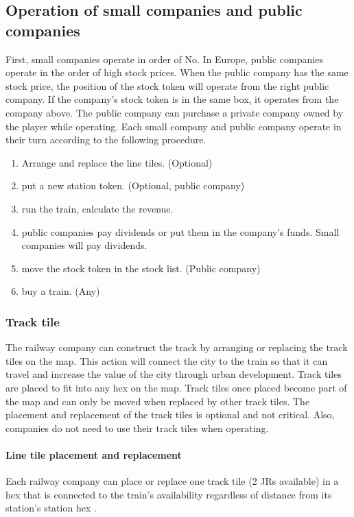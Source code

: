 \documentclass{article}
\begin{document}
\begin{CJK}{UTF8}{min}
\subsection{Operation of small companies and public companies}
First, small companies operate in order of No. In Europe, public
companies operate in the order of high stock prices. When the public
company has the same stock price, the position of the stock token will
operate from the right public company. If the company's stock token is
in the same box, it operates from the company above. The public
company can purchase a private company owned by the player while
operating. Each small company and public company operate in their turn
according to the following procedure.
\begin{enumerate}
\item Arrange and replace the line tiles. (Optional)
\item put a new station token. (Optional, public company)
\item run the train, calculate the revenue.
\item public companies pay dividends or put them in the company's
  funds. Small companies will pay dividends.
\item move the stock token in the stock list. (Public company)
\item buy a train. (Any)
\end{enumerate}

\subsubsection{Track tile}
The railway company can construct the track by arranging or replacing
the track tiles on the map. This action will connect the city to the
train so that it can travel and increase the value of the city through
urban development. Track tiles are placed to fit into any hex on the
map. Track tiles once placed become part of the map and can only be
moved when replaced by other track tiles. The placement and
replacement of the track tiles is optional and not critical. Also,
companies do not need to use their track tiles when operating.

\paragraph{Line tile placement and replacement}
Each railway company can place or replace one track tile (2 JRs
available) in a hex that is connected to the train's availability
regardless of distance from its station's station hex .


\end{CJK}
\end{document}
